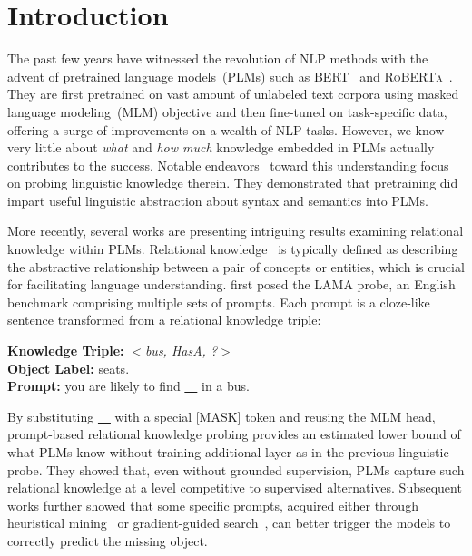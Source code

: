 \section{Introduction}
The past few years have witnessed the revolution of NLP methods with 
the advent of pretrained language models~(PLMs) such as 
\textsc{BERT}~\citep{DBLP:journals/corr/abs-1810-04805} and 
\textsc{RoBERTa}~\citep{DBLP:journals/corr/abs-1907-11692}. They are first pretrained on vast amount of unlabeled text corpora using masked language modeling~(MLM) objective and 
then fine-tuned on task-specific data, offering a surge of 
improvements on a wealth of NLP tasks. However, we know very little about
\textit{what} and \textit{how much} 
knowledge embedded in PLMs actually contributes to the success. 
Notable endeavors~\citep{peters-etal-2018-dissecting,DBLP:journals/corr/abs-1901-05287,DBLP:journals/corr/abs-1905-06316} toward this understanding focus on probing linguistic knowledge therein. They demonstrated that 
pretraining did impart useful linguistic abstraction about syntax and semantics into PLMs.


More recently, several works are presenting intriguing results examining 
 relational knowledge within PLMs. Relational knowledge~\citep{speer-havasi-2012-representing,wikidata} is typically defined as describing the abstractive relationship between a pair of concepts or entities, which is crucial for facilitating language understanding.
 \citet{Petroni2020} first posed the LAMA probe, 
 an English benchmark comprising multiple sets of prompts. Each prompt is a cloze-like sentence transformed from a relational knowledge triple:
 
 \noindent
 \textbf{Knowledge Triple: }\textit{$<$bus, HasA, ?$>$} \\
 \textbf{Object Label: }seats. \\
 \textbf{Prompt: }you are likely to find \underline{~~} in a bus.

 

By substituting  \underline{~~}  with a special [MASK] token and reusing the MLM head, prompt-based relational knowledge probing provides an estimated lower bound of what PLMs know without training additional layer as in the previous linguistic probe. They showed that, even without grounded supervision, 
PLMs capture such relational knowledge at a level competitive to supervised alternatives. Subsequent works further showed that some specific prompts, acquired either through heuristical mining~\citep{DBLP:journals/corr/abs-1911-12543} or gradient-guided search~\citep{Shin2020}, can better trigger the models to correctly predict the missing object. 

